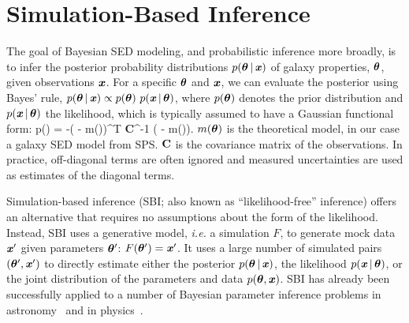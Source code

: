 \section{Simulation-Based Inference} \label{sec:sbi}
The goal of Bayesian SED modeling, and probabilistic inference more
broadly, is to infer the posterior probability distributions $p(\boldsymbol{\theta}\,|\,\textbf{\textit{x}})$
of galaxy properties, $\boldsymbol{\theta}$, given observations $\textbf{\textit{x}}$.
For a specific $\boldsymbol{\theta}$ and $\textbf{\textit{x}}$, we can evaluate the posterior using
Bayes' rule, $p(\boldsymbol{\theta}\,|\,\textbf{\textit{x}}) \propto p(\boldsymbol{\theta})~p(\textbf{\textit{x}}\,|\,\boldsymbol{\theta})$,  
where $p(\boldsymbol{\theta})$ denotes the prior distribution and
$p(\textbf{\textit{x}}\,|\,\boldsymbol{\theta})$ the likelihood, which is typically assumed to have a
Gaussian functional form: 
\beq
\label{eq:likelihood}
    \ln p(\given\btheta) = -( - m(\btheta))^T {\bf C}^{-1}
    ( - m(\btheta)).
\eeq
$m(\boldsymbol{\theta})$ is the theoretical model, in our case a galaxy SED model from SPS.
${\bf C}$ is the covariance matrix of the observations. 
In practice, off-diagonal terms are often ignored and measured uncertainties
are used as estimates of the diagonal terms. 


Simulation-based inference (SBI; also known as ``likelihood-free'' inference)
offers an alternative that requires no assumptions about the form of the
likelihood. 
Instead, SBI uses a generative model, \emph{i.e.} a simulation $F$, to generate
mock data $\textbf{\textit{x}}'$ given parameters $\boldsymbol{\theta}'$: $F(\boldsymbol{\theta}') = \textbf{\textit{x}}'$. 
It uses a large number of simulated pairs $(\boldsymbol{\theta}', \textbf{\textit{x}}')$ to directly estimate
either the posterior  $p(\boldsymbol{\theta}\,|\, \textbf{\textit{x}})$, the likelihood
$p(\textbf{\textit{x}}\,|\, \boldsymbol{\theta})$, or the joint distribution of the parameters and data $p(\boldsymbol{\theta}, \textbf{\textit{x}})$. 
SBI has already been successfully applied to a number of Bayesian parameter
inference problems in astronomy~\citep[\emph{e.g.}][]{cameron2012, weyant2013,
hahn2017b, kacprzak2018, alsing2018, wong2020, huppenkothen2021, zhang2021}
and in physics~\citep[\emph{e.g.}][]{brehmer2019, cranmer2020}.

